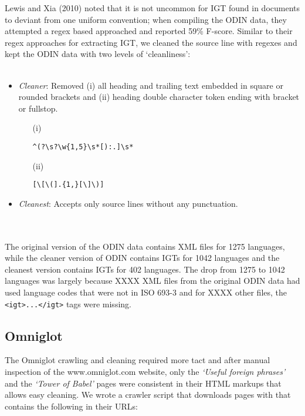 \documentclass[11pt]{article}
\begin{document}
Lewis and Xia (2010) noted that it is not uncommon for IGT found in documents to deviant from one uniform convention; when compiling the ODIN data, they attempted a regex based approached and reported 59\% F-score. Similar to their regex approaches for extracting IGT, we cleaned the source line with regexes and kept the ODIN data with two levels of `cleanliness':
\\ \\
\begin{minipage}{\columnwidth}
\begin{itemize}
\item \emph{Cleaner}: Removed (i) all heading and trailing text embedded in square or rounded brackets and (ii) heading double character token ending with bracket or fullstop.
\begin{itemize}
\item[(i)]
\begin{Verbatim}
^(?\s?\w{1,5}\s*[):.]\s*
\end{Verbatim}
\item[(ii)] 
\begin{Verbatim}
[\[\(].{1,}[\]\)]
\end{Verbatim}
\end{itemize}
\item \emph{Cleanest}: Accepts only source lines without any punctuation.
\end{itemize}
\end{minipage}
\\ \\
\noindent The original version of the ODIN data contains XML files for 1275 languages, while the cleaner version of ODIN contains IGTs for 1042 languages and the cleanest version contains IGTs for 402 languages. The drop from 1275 to 1042 languages was largely because {\color{red} XXXX} XML files from the original ODIN data had used language codes that were not in ISO 693-3 and for {\color{red} XXXX} other files, the \texttt{<igt>...</igt>} tags were missing. 

\subsection{Omniglot}

The Omniglot crawling and cleaning required more tact and after manual inspection of the www.omniglot.com website, only the \emph{`Useful foreign phrases'} and the \emph{`Tower of Babel'} pages were consistent in their HTML markups that allows easy cleaning. We wrote a crawler script that downloads pages with that contains the following in their URLs:
\end{document}
